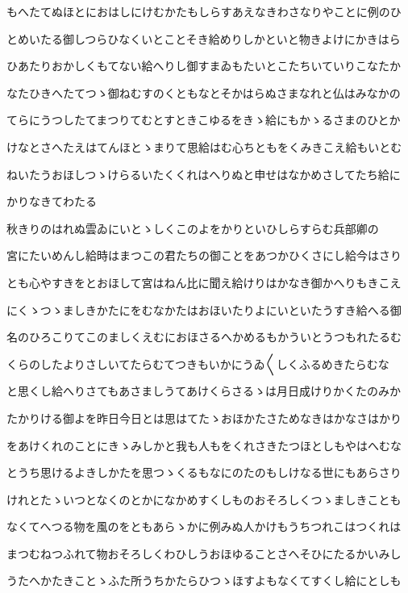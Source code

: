 \documentclass[a4paper,11pt,landscape]{ltjtarticle}
\begin{document}
もへたてぬほとにおはしにけむかたもしらすあえなきわさなりやことに例のひ
\par\medskip
とめいたる御しつらひなくいとことそき給めりしかといと物きよけにかきはら
\par\medskip
ひあたりおかしくもてない給へりし御すまゐもたいとこたちいていりこなたか
\par\medskip
なたひきへたてつゝ御ねむすのくともなとそかはらぬさまなれと仏はみなかの
\par\medskip
てらにうつしたてまつりてむとすときこゆるをきゝ給にもかゝるさまのひとか
\par\medskip
けなとさへたえはてんほとゝまりて思給はむ心ちともをくみきこえ給もいとむ
\par\medskip
ねいたうおほしつゝけらるいたくくれはへりぬと申せはなかめさしてたち給に
\par\medskip
かりなきてわたる
\par\medskip
秋きりのはれぬ雲ゐにいとゝしくこのよをかりといひしらすらむ兵部卿の
\par\medskip
宮にたいめんし給時はまつこの君たちの御ことをあつかひくさにし給今はさり
\par\medskip
とも心やすきをとおほして宮はねん比に聞え給けりはかなき御かへりもきこえ
\par\medskip
にくゝつゝましきかたにをむなかたはおほいたりよにいといたうすき給へる御
\par\medskip
名のひろこりてこのましくえむにおほさるへかめるもかういとうつもれたるむ
\par\medskip
くらのしたよりさしいてたらむてつきもいかにうゐ〱しくふるめきたらむな
\par\medskip
と思くし給へりさてもあさましうてあけくらさるゝは月日成けりかくたのみか
\par\medskip
たかりける御よを昨日今日とは思はてたゝおほかたさためなきはかなさはかり
\par\medskip
をあけくれのことにきゝみしかと我も人もをくれさきたつほとしもやはへむな
\par\medskip
とうち思けるよきしかたを思つゝくるもなにのたのもしけなる世にもあらさり
\par\medskip
けれとたゝいつとなくのとかになかめすくしものおそろしくつゝましきことも
\par\medskip
なくてへつる物を風のをともあらゝかに例みぬ人かけもうちつれこはつくれは
\par\medskip
まつむねつふれて物おそろしくわひしうおほゆることさへそひにたるかいみし
\par\medskip
うたへかたきことゝふた所うちかたらひつゝほすよもなくてすくし給にとしも
\end{document}
